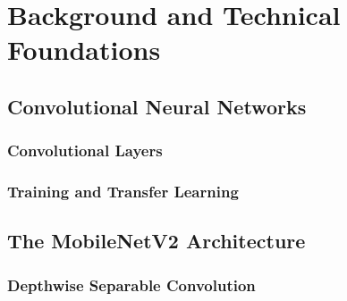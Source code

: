 %
\chapter{Background and Technical Foundations}
\label{chap:background}

\section{Convolutional Neural Networks}
\label{sec:cnn}

\subsection{Convolutional Layers}
\label{sec:conv-layers}

\subsection{Training and Transfer Learning}
\label{sec:transfer}

\section{The MobileNetV2 Architecture}
\label{sec:mobilenetv2}

\subsection{Depthwise Separable Convolution}
\label{sec:dwsep}

